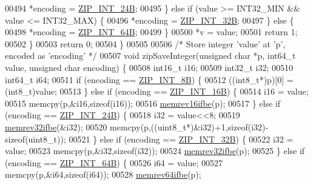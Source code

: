 \begin{DoxyCode}
{{00494             *encoding = \hyperlink{ziplist_8c_a74a906bccde7afa94f1068634a637152}{ZIP\_INT\_24B};
00495         \} \textcolor{keywordflow}{else} \textcolor{keywordflow}{if} (value >= INT32\_MIN && value <= INT32\_MAX) \{
00496             *encoding = \hyperlink{ziplist_8c_addebc046cc76d482d22d7b4bf90a0649}{ZIP\_INT\_32B};
00497         \} \textcolor{keywordflow}{else} \{
00498             *encoding = \hyperlink{ziplist_8c_a1f551b3ab3a4d79190f367e59d6dab0a}{ZIP\_INT\_64B};
00499         \}
00500         *v = value;
00501         \textcolor{keywordflow}{return} 1;
00502     \}
00503     \textcolor{keywordflow}{return} 0;
00504 \}
00505 
00506 \textcolor{comment}{/* Store integer 'value' at 'p', encoded as 'encoding' */}
00507 \textcolor{keywordtype}{void} zipSaveInteger(\textcolor{keywordtype}{unsigned} \textcolor{keywordtype}{char} *p, int64\_t value, \textcolor{keywordtype}{unsigned} \textcolor{keywordtype}{char} encoding) \{
00508     int16\_t i16;
00509     int32\_t i32;
00510     int64\_t i64;
00511     \textcolor{keywordflow}{if} (encoding == \hyperlink{ziplist_8c_a0c6338e8866d85135cfc7c340b2c213c}{ZIP\_INT\_8B}) \{
00512         ((int8\_t*)p)[0] = (int8\_t)value;
00513     \} \textcolor{keywordflow}{else} \textcolor{keywordflow}{if} (encoding == \hyperlink{ziplist_8c_a57e9bc0aacf9f30d8b76566e40c31a6b}{ZIP\_INT\_16B}) \{
00514         i16 = value;
00515         memcpy(p,&i16,\textcolor{keyword}{sizeof}(i16));
00516         \hyperlink{endianconv_8h_a49372891e83ab7a970f0d98dda1870d9}{memrev16ifbe}(p);
00517     \} \textcolor{keywordflow}{else} \textcolor{keywordflow}{if} (encoding == \hyperlink{ziplist_8c_a74a906bccde7afa94f1068634a637152}{ZIP\_INT\_24B}) \{
00518         i32 = value<<8;
00519         \hyperlink{endianconv_8h_a771f3656eb7d11a1e7f7294b657d8978}{memrev32ifbe}(&i32);
00520         memcpy(p,((uint8\_t*)&i32)+1,\textcolor{keyword}{sizeof}(i32)-\textcolor{keyword}{sizeof}(uint8\_t));
00521     \} \textcolor{keywordflow}{else} \textcolor{keywordflow}{if} (encoding == \hyperlink{ziplist_8c_addebc046cc76d482d22d7b4bf90a0649}{ZIP\_INT\_32B}) \{
00522         i32 = value;
00523         memcpy(p,&i32,\textcolor{keyword}{sizeof}(i32));
00524         \hyperlink{endianconv_8h_a771f3656eb7d11a1e7f7294b657d8978}{memrev32ifbe}(p);
00525     \} \textcolor{keywordflow}{else} \textcolor{keywordflow}{if} (encoding == \hyperlink{ziplist_8c_a1f551b3ab3a4d79190f367e59d6dab0a}{ZIP\_INT\_64B}) \{
00526         i64 = value;
00527         memcpy(p,&i64,\textcolor{keyword}{sizeof}(i64));
00528         \hyperlink{endianconv_8h_aa311b9f944c3b988f3601698a95890c1}{memrev64ifbe}(p);
}}
\end{DoxyCode}
